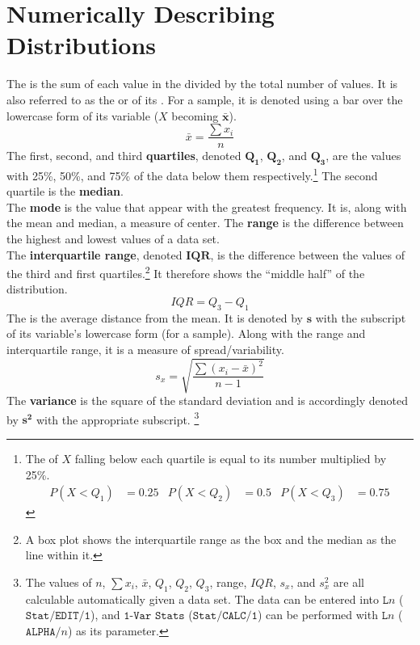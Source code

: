 \documentclass[../AP_Statistics.tex]{subfiles}
\begin{document}
		\section{Numerically Describing Distributions}
			The  is the sum of each value in the  divided by the total number of values. It is also referred to as the  or  of its . For a sample, it is denoted using a bar over the lowercase form of its variable ($X$ becoming $\bm{\bar{x}}$).
			\[\bar{x} = \frac{\sum x_i}{n}\]
			The first, second, and third \textbf{quartiles}, denoted $\bm{Q_1}$, $\bm{Q_2}$, and $\bm{Q_3}$, are the values with 25\%, 50\%, and 75\% of the data below them respectively.\footnote{The  of $X$ falling below each quartile is equal to its number multiplied by 25\%. \begin{align*} P(X < Q_1) &= 0.25 & P(X < Q_2) &= 0.5 & P(X < Q_3) &= 0.75\end{align*}} The second quartile is the \textbf{median}. \\
			The \textbf{mode} is the value that appear with the greatest frequency. It is, along with the mean and median, a measure of center.
			The \textbf{range} is the difference between the highest and lowest values of a data set. \\
			The \textbf{interquartile range}, denoted $\bm{IQR}$, is the difference between the values of the third and first quartiles.\footnote{A box plot shows the interquartile range as the box and the median as the line within it.} It therefore shows the \enquote{middle half} of the distribution.
			\[IQR = Q_3 - Q_1\]
			The  is the average distance from the mean. It is denoted by $\bm{s}$  with the subscript of its variable's lowercase form (for a sample). Along with the range and interquartile range, it is a measure of spread/variability.
			\[s_x = \sqrt{\frac{\sum (x_i - \bar{x})^2}{n - 1}}\]
			The \textbf{variance} is the square of the standard deviation and is accordingly denoted by $\bm{s^2}$ with the appropriate subscript. \footnote{The values of $n$, $\sum x_i$, $\bar{x}$, $Q_1$, $Q_2$, $Q_3$,  range, $IQR$, $s_x$, and $s_x^2$ are all calculable automatically given a data set. The data can be entered into $\texttt{L}n$ ($\texttt{Stat/EDIT/1}$), and $\texttt{1-Var Stats}$ ($\texttt{Stat/CALC/1}$) can be performed with $\texttt{L}n$ ($\texttt{ALPHA/}n$) as its parameter.} \\
\end{document}
